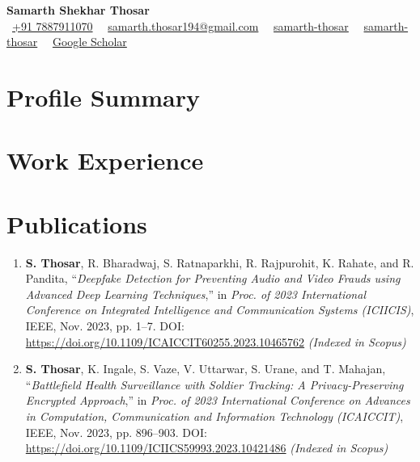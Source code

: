 \documentclass{article}
\begin{document}
\pagestyle{empty}
\begin{center}
    \textbf{\Huge{Samarth Shekhar Thosar}} \\[8pt]
    \faMobile* \ \href{tel:+917887911070}{+91 7887911070} \textbar\
    \faEnvelope \ \href{mailto:samarth.thosar194@gmail.com}{samarth.thosar194@gmail.com} \textbar\
    \faLinkedin \ \href{https://linkedin.com/in/samarth-thosar}{samarth-thosar} \textbar\
    \faGithub \ \href{https://github.com/samarth-thosar}{samarth-thosar} \textbar\
    \faGraduationCap \ \href{https://scholar.google.com/citations?user=GROqtyIAAAAJ&hl}{Google Scholar}
\end{center}

\section{Profile Summary}

\vspace{10pt}
\section{Work Experience}
\vspace{4pt}

\section{Publications}
\begin{enumerate}

    \item \textbf{S. Thosar}, R. Bharadwaj, S. Ratnaparkhi, R. Rajpurohit, K. Rahate, and R. Pandita,
    “\textit{Deepfake Detection for Preventing Audio and Video Frauds using Advanced Deep Learning Techniques},”
    in \textit{Proc. of 2023 International Conference on Integrated Intelligence and Communication Systems (ICIICIS)},
    IEEE, Nov. 2023, pp. 1–7.
    DOI: \url{https://doi.org/10.1109/ICAICCIT60255.2023.10465762}
    \textit{(Indexed in Scopus)}

    \item \textbf{S. Thosar}, K. Ingale, S. Vaze, V. Uttarwar, S. Urane, and T. Mahajan,
    “\textit{Battlefield Health Surveillance with Soldier Tracking: A Privacy-Preserving Encrypted Approach},”
    in \textit{Proc. of 2023 International Conference on Advances in Computation, Communication and Information Technology (ICAICCIT)},
    IEEE, Nov. 2023, pp. 896–903.
    DOI: \url{https://doi.org/10.1109/ICIICS59993.2023.10421486}
    \textit{(Indexed in Scopus)}

\end{enumerate}
\end{document}
